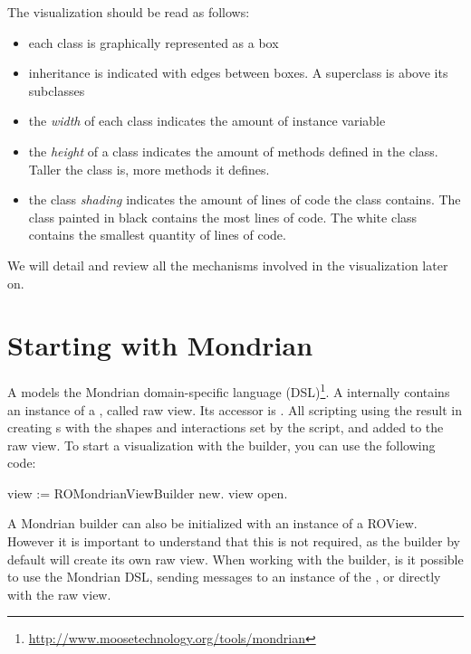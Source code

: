 \documentclass[a4paper,10pt,twoside]{book}
\begin{document}
The visualization should be read as follows:

\begin{itemize}
\item each class is graphically represented as a box
\item inheritance is indicated with edges between boxes. A superclass is above its subclasses
\item the \emph{width} of each class indicates the amount of instance variable 
\item the \emph{height} of a class indicates the amount of methods defined in the class. Taller the class is, more methods it defines.
\item the class \emph{shading} indicates the amount of lines of code the class contains. The class painted in black contains the most lines of code. The white class contains the smallest quantity of lines of code.
\end{itemize}

We will detail and review all the mechanisms involved in the visualization later on.


\section{Starting with Mondrian}



A  models the Mondrian domain-specific language (DSL)\footnote{\url{http://www.moosetechnology.org/tools/mondrian}}. %
A  internally contains an instance of a , called raw view. Its accessor is . All scripting  using the  result in creating s with the shapes and interactions set by the script, and added to the raw view. To start a visualization with the builder, you can use the following code:

\begin{code}{}
view := ROMondrianViewBuilder new.
view open.
\end{code}

A Mondrian builder can also be initialized with an instance of a ROView. However it is important to understand that this is not required, as the builder by default will create its own raw view.
When working with the builder, is it possible to use the Mondrian DSL, sending messages to an instance of the , or directly with the raw view. %
\end{document}
